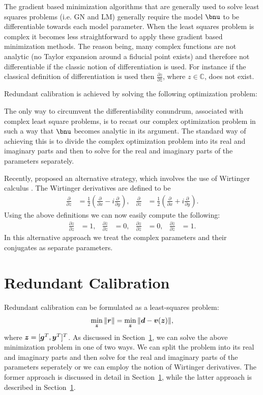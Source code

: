 \documentclass[useAMS,usenatbib]{mn2e}
\newcommand{\bz}{\bmath{z}}
\newcommand{\br}{\bmath{r}}
\newcommand{\bg}{\bmath{g}}
\newcommand{\bd}{\bmath{d}}
\newcommand{\bv}{\bmath{v}}
\newcommand{\by}{\bmath{y}}
\newcommand{\conj}[1]{\overline{#1}}
\begin{document}
The gradient based minimization algorithms that are generally used to solve least squares problems (i.e. GN and LM) generally require the model $\bnu$ to be differentiable
towards each model parameter. When the least squares problem is complex it becomes less straightforward to apply these gradient based minimization methods. The reason being,
many complex functions are not analytic (no Taylor expansion around a fiducial point exists) and therefore not differentiable if the classic notion of differentiation is used. For instance if the 
classical definition of differentiation is used then $\frac{\partial z}{\partial \conj{z}}$, where $z \in \mathbb{C}$, does not exist.

Redundant calibration is achieved by solving the following optimization problem:

The only way to circumvent the differentiability conundrum, associated with complex least square problems, is to recast our complex optimization problem in such a way that $\bnu$ becomes analytic in its argument.
The standard way of achieving this is to divide the complex optimization problem into its real and imaginary parts and then to solve for the real and imaginary parts of the parameters separately.

Recently, \citet{Sorber2012} proposed an alternative strategy, which involves the use of Wirtinger calculus \citep{Wirtinger1927}. The Wirtinger derivatives 
are defined to be 
\begin{align}
\label{eq:wir}
\frac{\partial}{\partial z} &= \frac{1}{2}\left ( \frac{\partial}{\partial x} -  i \frac{\partial}{\partial y} \right ),&\frac{\partial}{\partial \conj{z}} &= \frac{1}{2}\left ( \frac{\partial}{\partial x} +  i \frac{\partial}{\partial y} \right ). 
\end{align}
Using the above definitions we can now easily compute the following:
\begin{align}
\frac{\partial z}{\partial z} & = 1, & \frac{\partial \conj{z}}{\partial z}&=0, & \frac{\partial z}{\partial \conj{z}} & = 0, & \frac{\partial \conj{z}}{\partial \conj{z}}&=1.
\end{align}
In this alternative approach we treat the complex parameters and their conjugates as separate parameters.

\section{Redundant Calibration}
Redundant calibration can be formulated as a least-squares problem:
\begin{equation}
\label{eq:least_squares_red}
\min_{\bz} \|\br\| = \min_{\bz} \|\bd - \bv(\bz)\|, 
\end{equation}
where $\bz = [\bg^T,\by^T]^T$. As discussed in Section~\ref{}, we can solve the above minimization problem in one of two ways. We can split the problem into its real and
imaginary parts and then solve for the real and imaginary parts of the parameters seperately or we can employ the notion of Wirtinger derivatives. The former 
approach is discussed in detail in Section~\ref{}, while the latter approach is described in Section~\ref{}.
\end{document}
